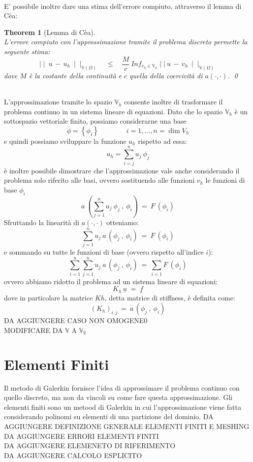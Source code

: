 \documentclass[12pt,a4paper]{report}
\theoremstyle{theorem}
\newtheorem{theorem}{Theorem}[section]
\theoremstyle{definition}
\begin{document}
\hfill \\
E' possibile inoltre dare una stima dell'errore compiuto, attraverso il lemma di Cèa:
\begin{theorem} [Lemma di Cèa]
\hfill \\
L'errore compiuto con l'approssimazione tramite il problema discreto permette la seguente stima:
\[ \mid \mid \ u \, - \, u_{h} \ \mid \mid_{\mathbb{V}(\Omega)} \quad \leq \quad \frac{M}{c} \ Inf_{v_{h} \in \mathbb{V}_{h}} \mid \mid \ u \, - \, v_{h} \ \mid \mid_{\mathbb{V}(\Omega)} \]
dove $M$ è la costante della continuità e $c$ quella della coercività di $a(\cdot,\cdot)$.
\qed
\end{theorem}
\hfill \\
L'approssimazione tramite lo spazio $\mathbb{V}_{h}$ consente inoltre di trasformare il problema continuo in un sistema lineare di equazioni. Dato che lo spazio $\mathbb{V}_{h}$ è un sottospazio vettoriale finito, possiamo considerarne una base
\[ \overline{\phi} = \left \{ \phi_{i} \right \} \qquad \qquad i = 1,..., n = \dim{V_{h}} \]
e quindi possiamo sviluppare la funzione $u_{h}$ rispetto ad essa:
\[ u_{h} = \sum_{i = j}^{n} u_{j} \ \phi_{j} \]
è inoltre possibile dimostrare che l'approssimazione vale anche considerando il problema solo riferito alle basi, ovvero sostituendo alle funzioni $v_{h}$ le funzioni di base $\phi_{i}$
\[ a \ \left( \sum_{j = 1}^{n} u_{j} \ \phi_{j} \ , \ \phi_{i} \right) \ = \ F \ \left(  \phi_{i} \right) \]
Sfruttando la linearità di $a(\cdot,\cdot)$ otteniamo:
\[ \sum_{j = 1}^{n} u_{j} \ a \, \left( \phi_{j} \ , \ \phi_{i} \right) \ = \ F \ \left(  \phi_{i} \right) \]
e sommando su tutte le funzioni di base (ovvero rispetto all'indice $i$):
\[ \sum_{i = 1}^{n} \sum_{j = 1}^{n} u_{j} \ a \, \left( \phi_{j} \ , \ \phi_{i} \right) \ = \ \sum_{i = 1} F \ \left(  \phi_{i} \right) \]
ovvero abbiamo ridotto il problema ad un sistema lineare di equazioni:
\[ K_{h} \, \underline{u} \; = \; \underline{f} \]
dove in particolare la matrice $Kh$, detta matrice di stiffness, è definita come:
\[ (K_{h})_{i,j} \ = \ a \, \left( \phi_{j} \ , \ \phi_{i} \right) \]
{ \color{red} DA AGGIUNGERE CASO NON OMOGENE0\\}
{ \color{red} MODIFICARE DA $\mathbb{V}$ A $\mathbb{V_{0}}$\\}

\section{Elementi Finiti}
Il metodo di Galerkin fornisce l'idea di approssimare il problema continuo con quello discreto, ma non da vincoli su come fare questa approssimazione. Gli elementi finiti sono un metood di Galerkin in cui l'approssimazione viene fatta considerando polinomi su elementi di una partizione del dominio.
{ \color{red} DA AGGIUNGERE DEFINIZIONE GENERALE ELEMENTI FINITI E MESHING\\}
{ \color{red} DA AGGIUNGERE ERRORI ELEMENTI FINITI\\}
{ \color{red} DA AGGIUNGERE ELEMENETO DI RIFERIMENTO\\}
{ \color{red} DA AGGIUNGERE CALCOLO ESPLICITO\\}
\end{document}
